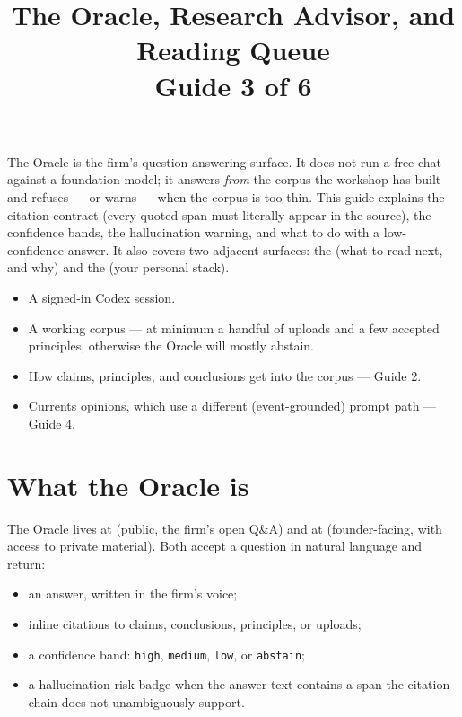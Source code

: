 \documentclass[11pt]{article}
\title{\sffamily\bfseries The Oracle, Research Advisor, and Reading Queue\\[2pt]\large Guide 3 of 6}
\date{}
\author{}
\begin{document}
\maketitle
\thispagestyle{empty}

\begin{tldr}
The Oracle is the firm's question-answering surface. It does not run a
free chat against a foundation model; it answers \emph{from} the corpus
the workshop has built and refuses --- or warns --- when the corpus is
too thin. This guide explains the citation contract (every quoted span
must literally appear in the source), the confidence bands, the
hallucination warning, and what to do with a low-confidence answer. It
also covers two adjacent surfaces: the  (what
to read next, and why) and the  (your personal
stack).
\end{tldr}

\begin{youwillneed}
\begin{itemize}[leftmargin=*,itemsep=0.2em,topsep=0.2em]
  \item A signed-in Codex session.
  \item A working corpus --- at minimum a handful of uploads and a few
        accepted principles, otherwise the Oracle will mostly abstain.
\end{itemize}
\end{youwillneed}

\begin{notcovered}
\begin{itemize}[leftmargin=*,itemsep=0.2em,topsep=0.2em]
  \item How claims, principles, and conclusions get into the corpus
        --- Guide 2.
  \item Currents opinions, which use a different (event-grounded)
        prompt path --- Guide 4.
\end{itemize}
\end{notcovered}

\section{What the Oracle is}

The Oracle lives at  (public, the firm's open Q\&A) and at
 (founder-facing, with access to private material).
Both accept a question in natural language and return:

\begin{itemize}[leftmargin=*,itemsep=0.2em]
  \item an answer, written in the firm's voice;
  \item inline citations to claims, conclusions, principles, or
        uploads;
  \item a confidence band: \texttt{high}, \texttt{medium},
        \texttt{low}, or \texttt{abstain};
  \item a hallucination-risk badge when the answer text contains a
        span the citation chain does not unambiguously support.
\end{itemize}
\end{document}
